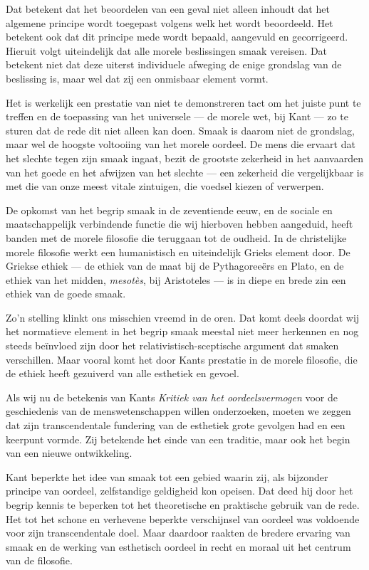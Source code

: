 Dat betekent dat het beoordelen van een geval niet alleen inhoudt dat het algemene principe wordt toegepast volgens welk het wordt beoordeeld. Het betekent ook dat dit principe mede wordt bepaald, aangevuld en gecorrigeerd. Hieruit volgt uiteindelijk dat alle morele beslissingen smaak vereisen. Dat betekent niet dat deze uiterst individuele afweging de enige grondslag van de beslissing is, maar wel dat zij een onmisbaar element vormt.

Het is werkelijk een prestatie van niet te demonstreren tact om het juiste punt te treffen en de toepassing van het universele — de morele wet, bij Kant — zo te sturen dat de rede dit niet alleen kan doen. Smaak is daarom niet de grondslag, maar wel de hoogste voltooiing van het morele oordeel. De mens die ervaart dat het slechte tegen zijn smaak ingaat, bezit de grootste zekerheid in het aanvaarden van het goede en het afwijzen van het slechte — een zekerheid die vergelijkbaar is met die van onze meest vitale zintuigen, die voedsel kiezen of verwerpen.

De opkomst van het begrip smaak in de zeventiende eeuw, en de sociale en maatschappelijk verbindende functie die wij hierboven hebben aangeduid, heeft banden met de morele filosofie die teruggaan tot de oudheid. In de christelijke morele filosofie werkt een humanistisch en uiteindelijk Grieks element door. De Griekse ethiek — de ethiek van de maat bij de Pythagoreeërs en Plato, en de ethiek van het midden, \textit{mesotès}, bij Aristoteles — is in diepe en brede zin een ethiek van de goede smaak.

Zo'n stelling klinkt ons misschien vreemd in de oren. Dat komt deels doordat wij het normatieve element in het begrip smaak meestal niet meer herkennen en nog steeds beïnvloed zijn door het relativistisch-sceptische argument dat smaken verschillen. Maar vooral komt het door Kants prestatie in de morele filosofie, die de ethiek heeft gezuiverd van alle esthetiek en gevoel.

Als wij nu de betekenis van Kants \textit{Kritiek van het oordeelsvermogen} voor de geschiedenis van de menswetenschappen willen onderzoeken, moeten we zeggen dat zijn transcendentale fundering van de esthetiek grote gevolgen had en een keerpunt vormde. Zij betekende het einde van een traditie, maar ook het begin van een nieuwe ontwikkeling.

Kant beperkte het idee van smaak tot een gebied waarin zij, als bijzonder principe van oordeel, zelfstandige geldigheid kon opeisen. Dat deed hij door het begrip kennis te beperken tot het theoretische en praktische gebruik van de rede. Het tot het schone en verhevene beperkte verschijnsel van oordeel was voldoende voor zijn transcendentale doel. Maar daardoor raakten de bredere ervaring van smaak en de werking van esthetisch oordeel in recht en moraal uit het centrum van de filosofie.

